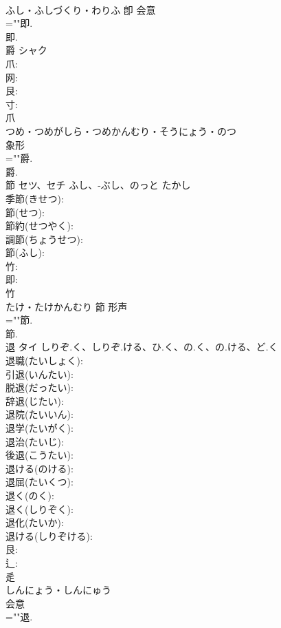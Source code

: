 \documentclass[8pt]{extreport}
\begin{document}
\begin{CJK}{UTF8}{min}
\\	ふし・ふしづくり・わりふ	卽	会意 
\\	=""即.
\\	即.
\\	爵	シャク			
\\	爪: 
\\	网: 
\\	艮: 
\\	寸: 
\\	爪	
\\	つめ・つめがしら・つめかんむり・そうにょう・のつ	
\\	象形 
\\	=""爵.
\\	爵.
\\	節	セツ、セチ	ふし、-ぶし、のっと	たかし	
\\	季節(きせつ): 
\\	節(せつ): 
\\	節約(せつやく): 
\\	調節(ちょうせつ): 
\\	節(ふし): 
\\	竹: 
\\	即: 
\\	竹	
\\	たけ・たけかんむり	節	形声 
\\	=""節.
\\	節.
\\	退	タイ	しりぞ.く、しりぞ.ける、ひ.く、の.く、の.ける、ど.く		
\\	退職(たいしょく): 
\\	引退(いんたい): 
\\	脱退(だったい): 
\\	辞退(じたい): 
\\	退院(たいいん): 
\\	退学(たいがく): 
\\	退治(たいじ): 
\\	後退(こうたい): 
\\	退ける(のける): 
\\	退屈(たいくつ): 
\\	退く(のく): 
\\	退く(しりぞく): 
\\	退化(たいか): 
\\	退ける(しりぞける): 
\\	艮: 
\\	辶: 
\\	辵	
\\	しんにょう・しんにゅう	
\\	会意 
\\	=""退.

\end{CJK}
\end{document}
